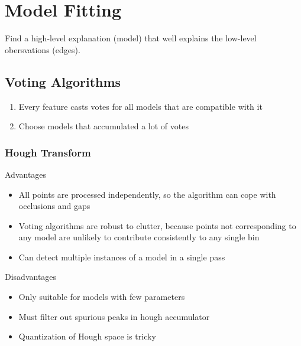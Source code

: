 \section{Model Fitting}
Find a high-level explanation (model) that well explains the low-level obersvations (edges).

\subsection{Voting Algorithms}
\begin{enumerate}
    \item Every feature casts votes for all models that are compatible with it
    \item Choose models that accumulated a lot of votes
\end{enumerate}

\subsubsection{Hough Transform}
\begin{minipage}[t]{0.5\textwidth}
    Advantages
    \begin{itemize}
        \item All points are processed independently, so the algorithm can cope with occlusions and gaps
        \item Voting algorithms are robust to clutter, because points not corresponding to any model are unlikely to contribute consistently to any single bin
        \item Can detect multiple instances of a model in a single pass
    \end{itemize}
\end{minipage}
\begin{minipage}[t]{0.5\textwidth}
    Disadvantages
    \begin{itemize}
        \item Only suitable for models with few parameters
        \item Must filter out spurious peaks in hough accumulator
        \item Quantization of Hough space is tricky
    \end{itemize}
\end{minipage}

